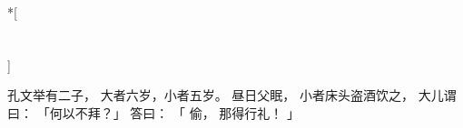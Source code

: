 
\switchcolumn[0]*[\section{}]

孔文举有二子，
大者六岁，小者五岁。
昼日父眠，
小者床头盗酒饮之，
大儿谓曰：
「何以不拜？」
答曰：
「
    偷，
    那得行礼！
」

\switchcolumn



